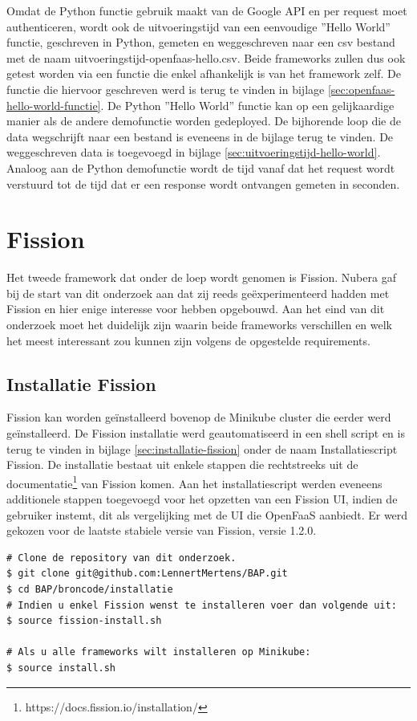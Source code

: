 Omdat de Python functie gebruik maakt van de Google API en per request moet authenticeren, wordt ook de uitvoeringstijd van een eenvoudige ''Hello World'' functie, geschreven in Python, gemeten en weggeschreven naar een csv bestand met de naam uitvoeringstijd-openfaas-hello.csv. Beide frameworks zullen dus ook getest worden via een functie die enkel afhankelijk is van het framework zelf. De functie die hiervoor geschreven werd is terug te vinden in bijlage \ref{sec:openfaas-hello-world-functie}. De Python ''Hello World'' functie kan op een gelijkaardige manier als de andere demofunctie worden gedeployed. De bijhorende loop die de data wegschrijft naar een bestand is eveneens in de bijlage terug te vinden. De weggeschreven data is toegevoegd in bijlage \ref{sec:uitvoeringstijd-hello-world}. Analoog aan de Python demofunctie wordt de tijd vanaf dat het request wordt verstuurd tot de tijd dat er een response wordt ontvangen gemeten in seconden.

\newpage
\section{Fission}
Het tweede framework dat onder de loep wordt genomen is Fission. Nubera gaf bij de start van dit onderzoek aan dat zij reeds geëxperimenteerd hadden met Fission en hier enige interesse voor hebben opgebouwd. Aan het eind van dit onderzoek moet het duidelijk zijn waarin beide frameworks verschillen en welk het meest interessant zou kunnen zijn volgens de opgestelde requirements.

\subsection{Installatie Fission}
Fission kan worden geïnstalleerd bovenop de Minikube cluster die eerder werd geïnstalleerd. De Fission installatie werd geautomatiseerd in een shell script en is terug te vinden in bijlage \ref{sec:installatie-fission} onder de naam Installatiescript Fission. De installatie bestaat uit enkele stappen die rechtstreeks uit de documentatie\footnote{https://docs.fission.io/installation/} van Fission komen. Aan het installatiescript werden eveneens additionele stappen toegevoegd voor het opzetten van een Fission UI, indien de gebruiker instemt, dit als vergelijking met de UI die OpenFaaS aanbiedt. Er werd gekozen voor de laatste stabiele versie van Fission, versie 1.2.0.

\begin{lstlisting}
# Clone de repository van dit onderzoek.
$ git clone git@github.com:LennertMertens/BAP.git
$ cd BAP/broncode/installatie
# Indien u enkel Fission wenst te installeren voer dan volgende uit:
$ source fission-install.sh

# Als u alle frameworks wilt installeren op Minikube:
$ source install.sh
\end{lstlisting}

